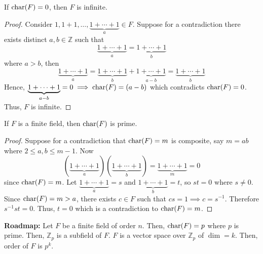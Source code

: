 \begin{thmbox}
    \begin{theorem}
        If $ \operatorname{char}(F)=0 $, then $ F $ is infinite.
    \end{theorem}
\end{thmbox}

\begin{proof}
    Consider $ 1,1+1,\ldots,\underbrace{1+\cdots+1}_{a}\in F $.
    Suppose for a contradiction there exists distinct $ a,b\in\mathbb{Z} $
    such that
    \[ \underbrace{1+\cdots+1}_{a}=\underbrace{1+\cdots+1}_{b} \]
    where $ a>b $, then
    \[ \underbrace{1+\cdots+1}_{a}=\underbrace{1+\cdots+1}_{b}+
        \underbrace{1+\cdots+1}_{a-b}=\underbrace{1+\cdots+1}_{b} \]
    Hence, $ \underbrace{1+\cdots+1}_{a-b}=0\implies \operatorname{char}(F)=(a-b) $
    which contradicts $ \operatorname{char}(F)=0 $. Thus, $ F $ is infinite.
\end{proof}

\begin{thmbox}
    \begin{theorem}
        If $ F $ is a finite field, then $ \operatorname{char}(F) $ is prime.
    \end{theorem}
\end{thmbox}

\begin{proof}
    Suppose for a contradiction that $ \operatorname{char}(F)=m $ is composite,
    say $ m=ab $ where
    $ 2\leqslant a,b\leqslant m-1 $. Now
    \[ (\underbrace{1+\cdots+1}_{a})(\underbrace{1+\cdots+1}_{b})
        =\underbrace{1+\cdots+1}_{m}=0 \]
    since $ \operatorname{char}(F)=m $. Let $ \underbrace{1+\cdots+1}_{a}=s $
    and $ \underbrace{1+\cdots+1}_{b}=t $, so $ st=0 $ where $ s\neq 0 $.
    Since $ \operatorname{char}(F)=m>a $, there exists $ c\in F $ such that
    $ cs=1 \implies c=s^{-1} $. Therefore $ s^{-1}st=0 $. Thus,
    $ t=0 $ which is a contradiction to $ \operatorname{char}(F)=m $.
\end{proof}

\textbf{Roadmap:} Let $ F $ be a finite field of order $ n $.
Then, $ \operatorname{char}(F)=p $ where $ p $ is prime. Then, $ \mathbb{Z}_p $ is a subfield
of $ F $. $ F $ is a vector space over $ \mathbb{Z}_p $ of $ \dim=k $.
Then, order of $ F $ is $ p^k $.
